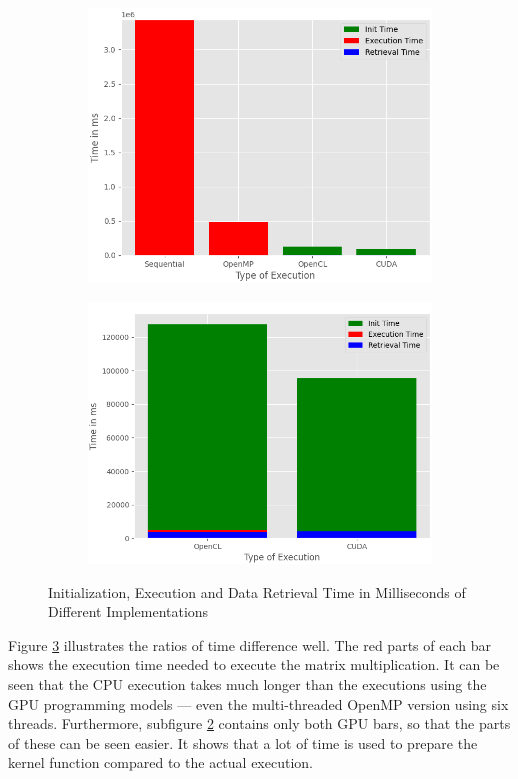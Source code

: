 \begin{figure}[htbp]
  \begin{center}
  \begin{subfigure}{0.45\textwidth}
    \includegraphics[width=\linewidth]{figures/results.png}
    \caption{ }
	\label{subfig:a}
  \end{subfigure}    
  \begin{subfigure}{0.45\textwidth}
    \includegraphics[width=\linewidth]{figures/GPUs_Time.png}
    \caption{ }
	\label{subfig:b}
  \end{subfigure}
    \caption{Initialization, Execution and Data Retrieval Time in Milliseconds of Different Implementations}
    \label{fig:time}
  \end{center}
\end{figure}

Figure \ref{fig:time} illustrates the ratios of time difference well.
The red parts of each bar shows the execution time needed to execute the matrix multiplication.
It can be seen that the CPU execution takes much longer than the executions using the GPU programming models --- even the multi-threaded OpenMP version using six threads.
Furthermore, subfigure \ref{subfig:b} contains only both GPU bars, so that the parts of these can be seen easier.
It shows that a lot of time is used to prepare the kernel function compared to the actual execution.

